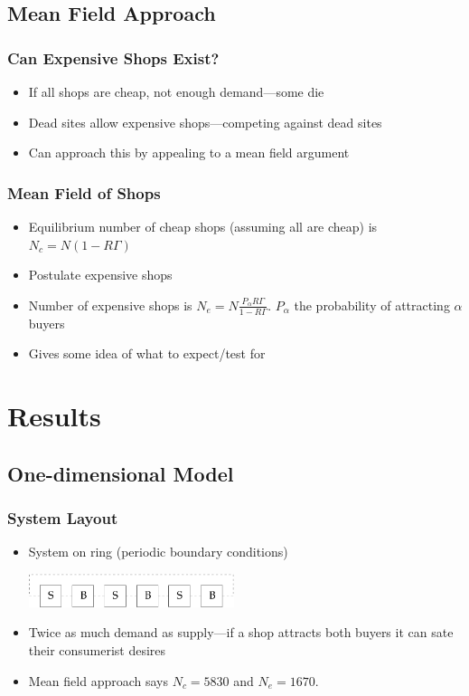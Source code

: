 \documentclass{beamer}
\begin{document}
\subsection{Mean Field Approach}

\frame 
{
  \frametitle{Can Expensive Shops Exist?}
  \begin{itemize}
    \setlength{\itemsep}{\baselineskip}
  \item<1-> If all shops are cheap, not enough demand---some die
  \item<2-> Dead sites allow expensive shops---competing
    against dead sites
  \item<3-> Can approach this by appealing to a mean field
    argument
  \end{itemize}
}

\frame
{
  \frametitle{Mean Field of Shops}
  \begin{itemize}
    \setlength{\itemsep}{\baselineskip}
  \item<1-> Equilibrium number of cheap shops (assuming all
    are cheap) is $N_c = N(1 - R\Gamma)$
  \item<2-> Postulate expensive shops
  \item<3-> Number of expensive shops is $N_e =
    N\frac{P_\alpha R\Gamma}{1 - R\Gamma}$.  $P_\alpha$ the
    probability of attracting $\alpha$ buyers
  \item<4-> Gives some idea of what to expect/test for
  \end{itemize}
}

\section{Results}

\subsection{One-dimensional Model}

\frame
{
  \frametitle{System Layout}
  \begin{itemize}
    \setlength{\itemsep}{\baselineskip}
  \item<1-> System on ring (periodic boundary conditions)
    \vspace{\baselineskip}
    \begin{center}
      \includegraphics[width=6cm]{03-24-undergrad-project-presentation.figures/one-dim-lattice}
    \end{center}
  \item<2-> Twice as much demand as supply---if a shop
    attracts both buyers it can sate their consumerist desires
  \item<3-> Mean field approach says $N_c = 5830$ and $N_e = 1670$.
  \end{itemize}
}
\end{document}
